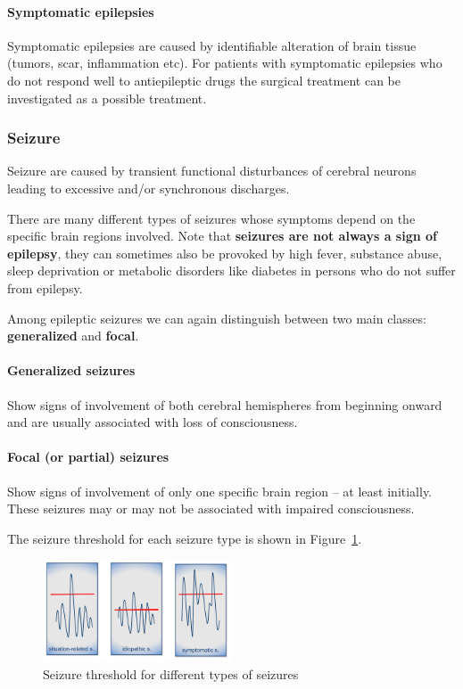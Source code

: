 \documentclass[12pt,article,oneside,a4paper]{memoir}
\begin{document}
\paragraph{Symptomatic epilepsies}
Symptomatic epilepsies are caused by identifiable alteration of brain tissue
(tumors, scar, inflammation etc). For patients with symptomatic epilepsies who
do not respond well to antiepileptic drugs the surgical treatment can be
investigated as a possible treatment.

\subsubsection{Seizure}
Seizure are caused by transient functional disturbances of cerebral neurons
leading to excessive and/or synchronous discharges.

There are many different types of seizures whose symptoms depend on the specific
brain regions involved. 
Note that \textbf{seizures are not always a sign of epilepsy}, they can
sometimes also be provoked by high fever, substance abuse, sleep deprivation or
metabolic disorders like diabetes in persons who do not suffer from epilepsy.

Among epileptic seizures we can again distinguish between two main classes:
\textbf{generalized} and \textbf{focal}.

\paragraph{Generalized seizures}
Show signs of involvement of both cerebral hemispheres from beginning onward
and are usually associated with loss of consciousness.

\paragraph{Focal (or partial) seizures}
Show signs of involvement of only one specific brain region – at least initially.
These seizures may or may not be associated with impaired consciousness.

The seizure threshold for each seizure type is shown in
Figure~\ref{fig:seizure-threshold}.

\begin{figure}
  \centering
  \includegraphics[width=0.5\textwidth]{imgs/seizure-threshold.png}
  \caption{Seizure threshold for different types of seizures}
  \label{fig:seizure-threshold}
\end{figure}
\end{document}
